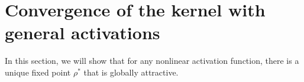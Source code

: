 \documentclass[twoside]{article}
\newcommand{\E}{\mathbb{E}\,}
\theoremstyle{definition}
\newcommand{\thomas}[1]{{\color{blue}\textit{#1}}}
\begin{document}






\section{Convergence of the kernel with general activations}
In this section, we will show that for any nonlinear activation function, there is a unique fixed point $\rho^*$ that is globally attractive.
\end{document}
